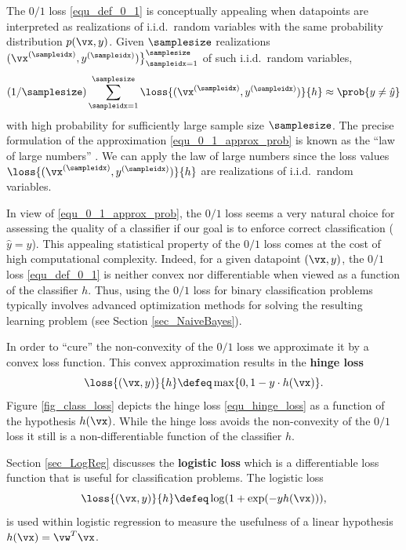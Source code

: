 \documentclass[12pt]{report}
\begin{document}
The $0/1$ loss \eqref{equ_def_0_1} is conceptually appealing when 
datapoints are interpreted as realizations of i.i.d.\ random variables 
with the same probability distribution $p(\vx,y)$. Given 
$\samplesize$ realizations $(\vx^{(\sampleidx)},y^{(\sampleidx)}) \big\}_{\sampleidx=1}^{\samplesize}$ 
of such i.i.d.\ random variables,
\begin{equation} 
\label{equ_0_1_approx_prob}
(1/\samplesize) \sum_{\sampleidx=1}^{\samplesize} \loss{(\vx^{(\sampleidx)},y^{(\sampleidx)})}{h} \approx \prob{ y \neq \hat{y} }
\end{equation} 
with high probability for sufficiently large sample size $\samplesize$. 
The precise formulation of the approximation \eqref{equ_0_1_approx_prob} 
is known as the ``law of large numbers'' \cite[Section 1]{BillingsleyProbMeasure}. 
We can apply the law of large numbers since the loss values $\loss{(\vx^{(\sampleidx)},y^{(\sampleidx)})}{h}$ 
are realizations of i.i.d.\ random variables. 

In view of \eqref{equ_0_1_approx_prob}, the $0/1$ loss seems 
a very natural choice for assessing the quality of a classifier 
if our goal is to enforce correct classification ($\hat{y}=y$). 
This appealing statistical property of the $0/1$ loss comes 
at the cost of high computational complexity. Indeed, for a 
given datapoint $(\vx,y)$, the $0/1$ loss \eqref{equ_def_0_1} 
is neither convex nor differentiable when viewed as a function 
of the classifier $h$. Thus, using the $0/1$ loss for binary 
classification problems typically involves advanced optimization 
methods for solving the resulting learning problem (see Section \ref{sec_NaiveBayes}). 

In order to ``cure'' the non-convexity of the $0/1$ loss we 
approximate it by a convex loss function. This convex 
approximation results in the {\bf hinge loss}
\begin{equation} 
\label{equ_hinge_loss}
\loss{(\vx,y)}{h} \defeq \max \{ 0 , 1 - y\cdot h(\vx) \}. 
\end{equation}
Figure \ref{fig_class_loss} depicts the hinge loss \eqref{equ_hinge_loss} 
as a function of the hypothesis $h(\vx)$. 
While the hinge loss avoids the non-convexity of the $0/1$ 
loss it still is a non-differentiable function of the classifier $h$. 

Section \ref{sec_LogReg} discusses the {\bf logistic loss} which is 
a differentiable loss function that is useful for classification problems. 
The logistic loss
\begin{equation} 
\label{equ_log_loss}
\loss{(\vx,y)}{h} \defeq  \log ( 1 + \exp(- y h(\vx))),
\end{equation}
is used within logistic regression to measure the usefulness of 
a linear hypothesis $h(\vx) = \vw^{T} \vx$. 
\end{document}
